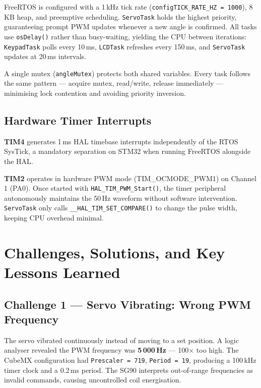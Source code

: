\documentclass[11pt, a4paper]{article}
\begin{document}
FreeRTOS is configured with a 1\,kHz tick rate (\texttt{configTICK\_RATE\_HZ = 1000}),
8\,KB heap, and preemptive scheduling. \texttt{ServoTask} holds the highest priority,
guaranteeing prompt PWM updates whenever a new angle is confirmed.
All tasks use \texttt{osDelay()} rather than busy-waiting, yielding the CPU between
iterations: \texttt{KeypadTask} polls every 10\,ms, \texttt{LCDTask} refreshes every 150\,ms,
and \texttt{ServoTask} updates at 20\,ms intervals.

A single mutex (\texttt{angleMutex}) protects both shared variables.
Every task follows the same pattern — acquire mutex, read/write, release immediately —
minimising lock contention and avoiding priority inversion.

\subsection{Hardware Timer Interrupts}

\textbf{TIM4} generates 1\,ms HAL timebase interrupts independently of the RTOS SysTick,
a mandatory separation on STM32 when running FreeRTOS alongside the HAL.

\textbf{TIM2} operates in hardware PWM mode (TIM\_OCMODE\_PWM1) on Channel\,1 (PA0).
Once started with \texttt{HAL\_TIM\_PWM\_Start()}, the timer peripheral autonomously
maintains the 50\,Hz waveform without software intervention.
\texttt{ServoTask} only calls \texttt{\_\_HAL\_TIM\_SET\_COMPARE()} to change the pulse
width, keeping CPU overhead minimal.

\section{Challenges, Solutions, and Key Lessons Learned}

\subsection{Challenge 1 — Servo Vibrating: Wrong PWM Frequency}

The servo vibrated continuously instead of moving to a set position.
A logic analyser revealed the PWM frequency was \textbf{5\,000\,Hz} — 100× too high.
The CubeMX configuration had \texttt{Prescaler = 719}, \texttt{Period = 19}, producing
a 100\,kHz timer clock and a 0.2\,ms period. The SG90 interprets out-of-range frequencies
as invalid commands, causing uncontrolled coil energisation.
\end{document}
